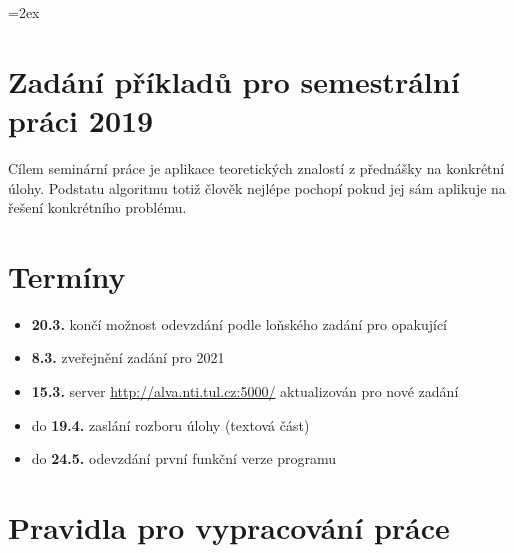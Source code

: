 \documentclass[a4paper,10pt]{article}
\begin{document}
\parskip=2ex
\parindent=0pt
\pagestyle{empty}
 \section*{Zadání příkladů pro semestrální práci 2019}

 Cílem seminární práce je aplikace teoretických znalostí z přednášky na konkrétní úlohy.
 Podstatu algoritmu totiž člověk nejlépe pochopí pokud jej sám aplikuje  na řešení konkrétního problému.
 
 \section{Termíny}
 \begin{itemize}
  \item {\bf 20.3.} končí možnost odevzdání podle loňského zadání pro opakující
  \item {\bf 8.3.} zveřejnění zadání pro 2021
  \item {\bf 15.3.} server \url{http://alva.nti.tul.cz:5000/} aktualizován pro nové zadání
  \item do {\bf 19.4.} zaslání rozboru úlohy (textová část)
  \item do {\bf 24.5.} odevzdání první funkční verze programu
 \end{itemize}

 \section{Pravidla pro vypracování práce}
\end{document}
